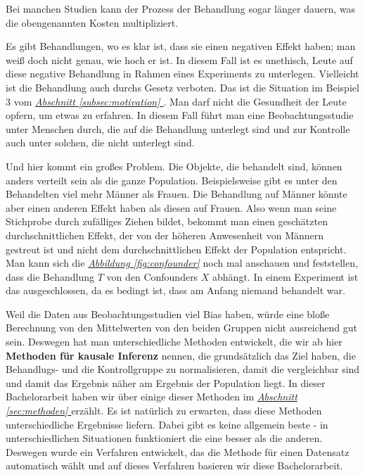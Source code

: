 \documentclass[12pt,a4paper,twoside]{scrartcl}
\numberwithin{equation}{section}
\newcommand{\reffig}[1]{\emph{\hyperref[#1]{Abbildung \ref*{#1}}}}
\newcommand{\refsec}[1]{\emph{\hyperref[#1]{Abschnitt \ref*{#1} }}}
\begin{document}
\noindent   
Bei manchen Studien kann der Prozess der Behandlung sogar länger dauern, was die obengenannten Kosten multipliziert.\par    

\noindent   
Es gibt Behandlungen, wo es klar ist, dass sie einen negativen Effekt haben; man weiß doch nicht genau, wie hoch er ist. In diesem Fall ist es unethisch, Leute auf diese negative Behandlung in Rahmen eines Experiments zu unterlegen. Vielleicht ist die Behandlung auch durchs Gesetz verboten. Das ist die Situation im Beispiel 3 vom \refsec{subsec:motivation}. Man darf nicht die Gesundheit der Leute opfern, um etwas zu erfahren. In diesem Fall führt man eine Beobachtungsstudie unter Menschen durch, die auf die Behandlung unterlegt sind und zur Kontrolle auch unter solchen, die nicht unterlegt sind.\par

\noindent
Und hier kommt ein großes Problem. Die Objekte, die behandelt sind, können anders verteilt sein als die ganze Population. Beispielsweise gibt es unter den Behandelten viel mehr Männer als Frauen. Die Behandlung auf Männer könnte aber einen anderen Effekt haben als diesen auf Frauen. Also wenn man seine Stichprobe durch zufälliges Ziehen bildet, bekommt man einen geschätzten durchschnittlichen Effekt, der von der höheren Anwesenheit von Männern gestreut ist und nicht dem durchschnittlichen Effekt der Population entspricht. Man kann sich die \reffig{fig:confounder} noch mal anschauen und feststellen, dass die Behandlung $T$ von den Confounders $X$ abhängt. In einem Experiment ist das ausgeschlossen, da es bedingt ist, dass am Anfang niemand behandelt war.\par


\noindent
Weil die Daten aus Beobachtungsstudien viel Bias haben, würde eine bloße Berechnung von den Mittelwerten von den beiden Gruppen nicht ausreichend gut sein. Deswegen hat man unterschiedliche Methoden entwickelt, die wir ab hier \textbf{Methoden für kausale Inferenz} nennen, die grundsätzlich das Ziel haben, die Behandlugs- und die Kontrollgruppe zu normalisieren, damit die vergleichbar sind und damit das Ergebnis näher am Ergebnis der Population liegt. In dieser Bachelorarbeit haben wir über einige dieser Methoden im \refsec{sec:methoden} erzählt. Es ist natürlich zu erwarten, dass diese Methoden unterschiedliche Ergebnisse liefern. Dabei gibt es keine allgemein beste - in unterschiedlichen Situationen funktioniert die eine besser als die anderen. Deswegen wurde ein Verfahren entwickelt, das die Methode für einen Datensatz automatisch wählt und auf dieses Verfahren basieren wir diese Bachelorarbeit.\par   
\end{document}
